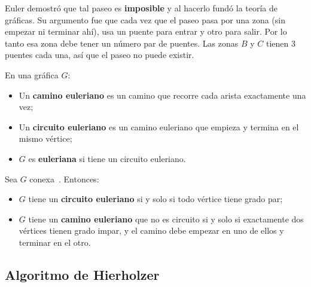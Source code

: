 \begin{figure}[H]
\begin{minipage}{0.49\linewidth}
\end{minipage}
\end{figure}
 
Euler demostró que tal paseo es \textbf{imposible} y al hacerlo fundó
la teoría de gráficas. Su argumento fue que cada vez que el paseo pasa por una
zona (sin empezar ni terminar ahí), usa un puente para entrar y otro
para salir. Por lo tanto esa zona debe tener un número par de puentes.
Las zonas $B$ y $C$ tienen 3 puentes cada una, así que el paseo
no puede existir.
 
\begin{definition}
En una gráfica $G$:
\begin{itemize}
    \item Un \textbf{camino euleriano} es un camino que recorre cada
          arista exactamente una vez;
    \item Un \textbf{circuito euleriano} es un camino euleriano que
          empieza y termina en el mismo vértice;
    \item $G$ es \textbf{euleriana} si tiene un circuito euleriano.
\end{itemize}
\end{definition}
 
Sea $G$ conexa~\cite{illinois_euler}. Entonces:
\begin{itemize}
    \item $G$ tiene un \textbf{circuito euleriano} si y solo si todo
          vértice tiene grado par;
    \item $G$ tiene un \textbf{camino euleriano} que no es circuito si y solo
          si exactamente dos vértices tienen grado impar, y el camino
          debe empezar en uno de ellos y terminar en el otro.
\end{itemize}
\subsection{Algoritmo de Hierholzer}
 
